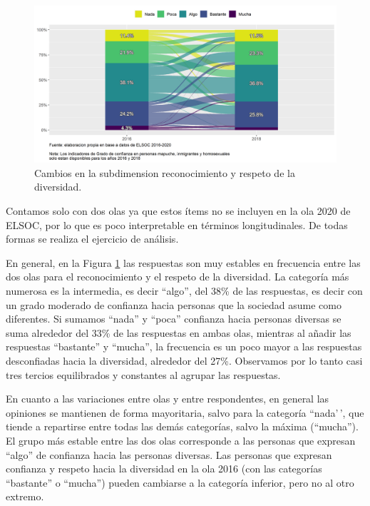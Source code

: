 \documentclass[
  12pt,
]{book}
\begin{document}
\begin{figure}[H]

{\centering \includegraphics[width=1\linewidth,height=1\textheight]{output/graphs/alluvial_diversidad} 

}

\caption{Cambios en la subdimension reconocimiento y respeto de la diversidad.}\label{fig:alluvial-diversidad}
\end{figure}

Contamos solo con dos olas ya que estos ítems no se incluyen en la ola 2020 de ELSOC, por lo que es poco interpretable en términos longitudinales. De todas formas se realiza el ejercicio de análisis.

En general, en la Figura \ref{fig:alluvial-diversidad} las respuestas son muy estables en frecuencia entre las dos olas para el reconocimiento y el respeto de la diversidad. La categoría más numerosa es la intermedia, es decir ``algo'', del 38\% de las respuestas, es decir con un grado moderado de confianza hacia personas que la sociedad asume como diferentes. Si sumamos ``nada'' y ``poca'' confianza hacia personas diversas se suma alrededor del 33\% de las respuestas en ambas olas, mientras al añadir las respuestas ``bastante'' y ``mucha'', la frecuencia es un poco mayor a las respuestas desconfiadas hacia la diversidad, alrededor del 27\%. Observamos por lo tanto casi tres tercios equilibrados y constantes al agrupar las respuestas.

En cuanto a las variaciones entre olas y entre respondentes, en general las opiniones se mantienen de forma mayoritaria, salvo para la categoría ``nada'\,', que tiende a repartirse entre todas las demás categorías, salvo la máxima (``mucha''). El grupo más estable entre las dos olas corresponde a las personas que expresan ``algo'' de confianza hacia las personas diversas. Las personas que expresan confianza y respeto hacia la diversidad en la ola 2016 (con las categorías ``bastante'' o ``mucha'') pueden cambiarse a la categoría inferior, pero no al otro extremo.
\end{document}
